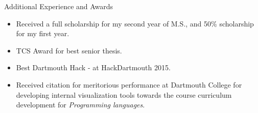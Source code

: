 \documentclass[]{mcdowellcv}
\begin{document}
	\begin{cvsection}{Additional Experience and Awards}
		\begin{cvsubsection}{}{}{}	
			\begin{itemize}
                \item Received a full scholarship for my second year of M.S., and 50\% scholarship for my first year.
				\item TCS Award for best senior thesis.
				\item Best Dartmouth Hack - at HackDartmouth 2015.
                \item Received citation for meritorious performance at Dartmouth College for developing internal visualization tools towards the course curriculum development for \textit{Programming languages}.
			\end{itemize}
		\end{cvsubsection}
	\end{cvsection}
\end{document}
